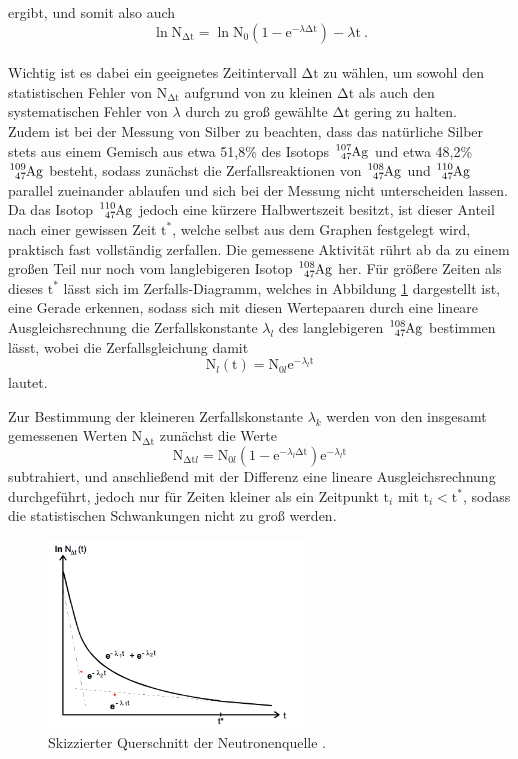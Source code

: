 ergibt, und somit also auch
\begin{equation}
  \ln{\text{N}_{\increment\text{t}}} = \ln{\text{N}_0(1-\text{e}^{ -\lambda \increment \text{t}})} -\lambda \text{t} \:.
  \label{eqn:lnN}
\end{equation}
\\
Wichtig ist es dabei ein geeignetes Zeitintervall $\increment\text{t}$ zu wählen, um sowohl
den statistischen Fehler von $\text{N}_{\increment\text{t}}$ aufgrund von zu kleinen
$\increment\text{t}$ als auch den systematischen Fehler von $\lambda$ durch zu groß gewählte
$\increment\text{t}$ gering zu halten.\\
Zudem ist bei der Messung von Silber zu beachten, dass das natürliche Silber stets
aus einem Gemisch aus etwa 51,8\% des Isotops $\ce{^{107}_{47}Ag}$ und etwa 48,2\% $\ce{^{109}_{47}Ag}$
besteht, sodass zunächst die Zerfallsreaktionen von $\ce{^{108}_{47}Ag}$ und $\ce{^{110}_{47}Ag}$
parallel zueinander ablaufen und sich bei der Messung nicht unterscheiden lassen.
Da das Isotop $\ce{^{110}_{47}Ag}$ jedoch eine kürzere Halbwertszeit besitzt,
ist dieser Anteil nach einer gewissen Zeit $\text{t}^*$, welche selbst aus dem Graphen festgelegt wird,
praktisch fast vollständig zerfallen.
Die gemessene Aktivität rührt ab da zu einem großen Teil nur noch vom langlebigeren Isotop
$\ce{^{108}_{47}Ag}$ her.
Für größere Zeiten als dieses $\text{t}^*$ lässt sich im Zerfalls-Diagramm, welches in
Abbildung \ref{fig:abfall} dargestellt ist, eine Gerade erkennen, sodass sich mit diesen
Wertepaaren durch eine lineare Ausgleichsrechnung die Zerfallskonstante $\lambda_l$
des langlebigeren $\ce{^{108}_{47}Ag}$ bestimmen lässt, wobei die Zerfallsgleichung damit
\begin{equation}
  \text{N}_l(\text{t}) = \text{N}_{0l} \text{e}^{ -\lambda_l \text{t}}
  \label{eqn:zl}
\end{equation}
lautet.

Zur Bestimmung der kleineren Zerfallskonstante $\lambda_k$ werden von den insgesamt gemessenen
Werten $\text{N}_{\increment\text{t}}$
zunächst die Werte
\begin{equation}
  \text{N}_{\increment\text{t}l} = \text{N}_{0l} (1- \text{e}^{ -\lambda_l \increment \text{t}})\text{e}^{ -\lambda_l \text{t}}
\end{equation}
subtrahiert, und anschließend mit der Differenz eine lineare Ausgleichsrechnung durchgeführt,
jedoch nur für Zeiten kleiner als ein Zeitpunkt $\text{t}_i$ mit
$\text{t}_i < \text{t}^*$, sodass die statistischen Schwankungen nicht zu groß werden.
\begin{figure}[H]
  \centering
  \includegraphics[height=5cm]{Abfall.png}
  \caption{Skizzierter Querschnitt der Neutronenquelle \cite{skript}.}
  \label{fig:abfall}
\end{figure}

